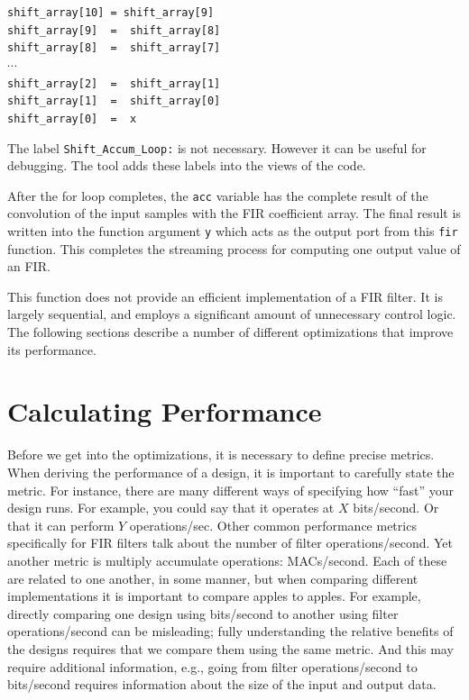 \begin{padbox}{.5\textwidth}
\noindent\lstinline{shift_array[10] = shift_array[9]} \\
\lstinline{shift_array[9]  =  shift_array[8]} \\
\lstinline{shift_array[8]  =  shift_array[7]} \\
$\cdots$ \\
\lstinline{shift_array[2]  =  shift_array[1]} \\
\lstinline{shift_array[1]  =  shift_array[0]} \\
\lstinline{shift_array[0]  =  x} \\
\end{padbox}
\begin{aside}
The label \lstinline{Shift_Accum_Loop:} is not necessary. However it can be useful for debugging. The \VHLS tool adds these labels into the views of the code. 
\end{aside}

After the for loop completes, the \lstinline{acc} variable has the complete result of the convolution of the input samples with the FIR coefficient array. The final result is written into the function argument \lstinline{y} which acts as the output port from this \lstinline{fir} function. This completes the streaming process for computing one output value of an FIR.

This function does not provide an efficient implementation of a FIR filter. It is largely sequential, and employs a significant amount of unnecessary control logic. The following sections describe a number of different optimizations that improve its performance.

\section{Calculating Performance}
\label{sec:fir-performance}

Before we get into the optimizations, it is necessary to define precise metrics. When deriving the performance of a design, it is important to carefully state the metric. For instance, there are many different ways of specifying how ``fast'' your design runs. For example, you could say that it operates at $X$ bits/second. Or that it can perform $Y$ operations/sec. Other common performance metrics specifically for FIR filters talk about the number of filter operations/second. Yet another metric is multiply accumulate operations: MACs/second. Each of these are related to one another, in some manner, but when comparing different implementations it is important to compare apples to apples. For example, directly comparing one design using bits/second to another using filter operations/second can be misleading; fully understanding the relative benefits of the designs requires that we compare them using the same metric. And this may require additional information, e.g., going from filter operations/second to bits/second requires information about the size of the input and output data. 

